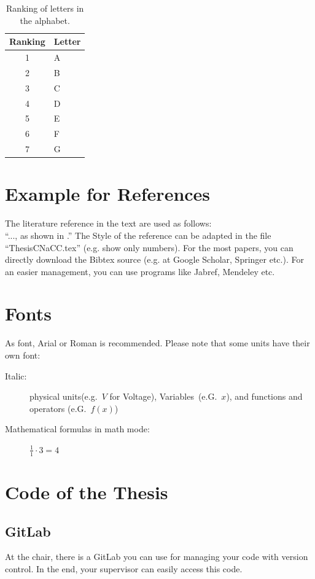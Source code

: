 	\begin{table}
		\begin{center}
			\begin{tabular}{cl}
				\toprule
				\textbf{Ranking} & \textbf{Letter} \\
				\midrule
				1 	& A \\
				2 	& B\\
				3	& C\\
				4	& D\\
				5	& E\\
				6	& F\\
				7	& G\\
				\bottomrule
			\end{tabular}
			\caption{Ranking of letters in the alphabet.}
			\label{table:ranking}
		\end{center}
	\end{table}
	
	
	\section{Example for References}
	The literature reference in the text are used as follows:\\
	``..., as shown in \cite{architecturemobilep2p}.'' The Style of the reference can be adapted in the file ``ThesisCNaCC.tex'' (e.g. show only numbers). For the most papers, you can directly download the Bibtex source (e.g. at Google Scholar, Springer etc.). For an easier management, you can use programs like Jabref, Mendeley etc.
	
	\section{Fonts}
	As font, Arial or Roman is recommended. Please note that some units have their own font:
	\begin{description}
		\item[Italic:] physical units(e.g.~$V$ for Voltage),
		Variables~(e.G.~$x$), and functions and operators (e.G.~$f(x)$)
		\item[Mathematical formulas in math mode:] $\frac{1}{1} \cdot 3 = 4$
	\end{description} 
	
	\section{Code of the Thesis}
	\subsection{GitLab} At the chair, there is a GitLab you can use for managing your code with version control. In the end, your supervisor can easily access this code.
	
